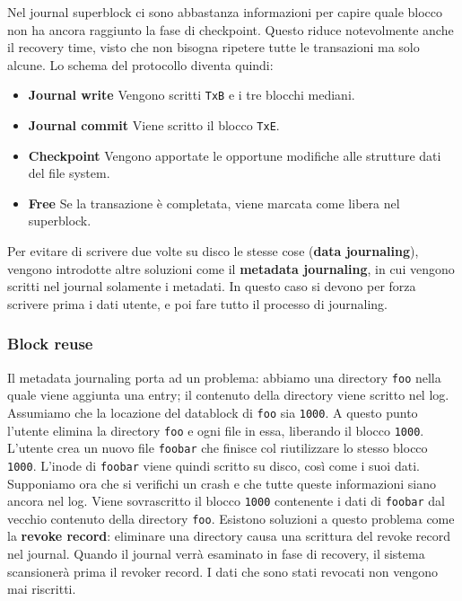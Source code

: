 \documentclass[12pt, twoside, letterpaper]{article}
\begin{document}
				Nel journal superblock ci sono abbastanza informazioni per capire quale blocco non ha ancora raggiunto la fase di checkpoint. Questo riduce notevolmente anche il recovery time, visto che non bisogna ripetere tutte le transazioni ma solo alcune.
				Lo schema del protocollo diventa quindi: 
				\begin{itemize}
					\item \textbf{Journal write} Vengono scritti \texttt{TxB} e i tre blocchi mediani.
					\item \textbf{Journal commit} Viene scritto il blocco \texttt{TxE}.
					\item \textbf{Checkpoint} Vengono apportate le opportune modifiche alle strutture dati del file system.
					\item \textbf{Free} Se la transazione è completata, viene marcata come libera nel superblock.
				\end{itemize}
				Per evitare di scrivere due volte su disco le stesse cose (\textbf{data journaling}), vengono introdotte altre soluzioni come il \textbf{metadata journaling}, in cui vengono scritti nel journal solamente i metadati. In questo caso si devono per forza scrivere prima i dati utente, e poi fare tutto il processo di journaling.
				
			\subsubsection{Block reuse}
				Il metadata journaling porta ad un problema: abbiamo una directory \texttt{foo} nella quale viene aggiunta una entry; il contenuto della directory viene scritto nel log. Assumiamo che la locazione del datablock di \texttt{foo} sia \texttt{1000}. A questo punto l'utente elimina la directory \texttt{foo} e ogni file in essa, liberando il blocco \texttt{1000}. L'utente crea un nuovo file \texttt{foobar} che finisce col riutilizzare lo stesso blocco \texttt{1000}. L'inode di \texttt{foobar} viene quindi scritto su disco, così come i suoi dati. Supponiamo ora che si verifichi un crash e che tutte queste informazioni siano ancora nel log. Viene sovrascritto il blocco \texttt{1000} contenente i dati di \texttt{foobar} dal vecchio contenuto della directory \texttt{foo}. Esistono soluzioni a questo problema come la \textbf{revoke record}: eliminare una directory causa una scrittura del revoke record nel journal. Quando il journal verrà esaminato in fase di recovery, il sistema scansionerà prima il revoker record. I dati che sono stati revocati non vengono mai riscritti.				
				
				
				
\end{document}
